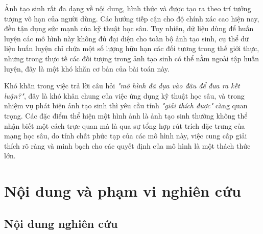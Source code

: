 %
Ảnh tạo sinh rất đa dạng về nội dung, hình thức và được tạo ra theo trí tưởng tượng vô hạn của người dùng. Các hướng tiếp cận cho độ chính xác cao hiện nay, đều tận dụng sức mạnh của kỹ thuật học sâu. Tuy nhiên, dữ liệu dùng để huấn luyện các mô hình này không đủ đại diện cho toàn bộ ảnh tạo sinh, cụ thể dữ liệu huấn luyện chỉ chứa một số lượng hữu hạn các đối tương trong thế giới thực, nhưng trong thực tế các đối tượng trong ảnh tạo sinh có thể nằm ngoài tập huấn luyện, đây là một khó khăn cơ bản của bài toán này.

Khó khăn trong việc trả lời câu hỏi \textit{"mô hình đã dựa vào đâu để đưa ra kết luận?"}, đây là khó khăn chung của việc ứng dụng kỹ thuật học sâu, và trong nhiệm vụ phát hiện ảnh tạo sinh thì yêu cầu tính \textit{"giải thích được"} càng quan trọng. Các đặc điểm thể hiện một hình ảnh là ảnh tạo sinh thường không thể nhận biết một cách trực quan mà là qua sự tổng hợp rút trích đặc trưng của mạng học sâu, do tính chất phức tạp của các mô hình này, việc cung cấp giải thích rõ ràng và minh bạch cho các quyết định của mô hình là một thách thức lớn.

%
\section{Nội dung và phạm vi nghiên cứu}

\subsection{Nội dung nghiên cứu}
%
%

